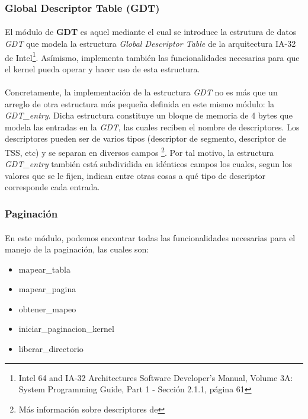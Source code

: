\documentclass[11pt, a4paper]{article}
\begin{document}
		\subsubsection{Global Descriptor Table (GDT)}
			\paragraph{}
			El módulo de \textbf{GDT} es aquel mediante el cual se introduce la estrutura de datos \textit{GDT} que modela la estructura \textit{Global Descriptor Table} de la arquitectura IA-32 de Intel\footnote{Intel 64 and IA-32 Architectures Software Developer’s Manual, Volume 3A: System Programming Guide, Part 1 - Sección 2.1.1, página 61}. Asímismo, implementa también las funcionalidades necesarias para que el kernel pueda operar y hacer uso de esta estructura.
			
			\paragraph{}
			Concretamente, la implementación de la estructura \textit{GDT} no es más que un arreglo de otra estructura más pequeña definida en este mismo módulo: la \textit{GDT\_entry}. Dicha estructura constituye un bloque de memoria de 4 bytes que modela las entradas en la \textit{GDT}, las cuales reciben el nombre de descriptores. Los descriptores pueden ser de varios tipos (descriptor de segmento, descriptor de TSS, etc) y se separan en diversos campos \footnote{Más información sobre descriptores de}. Por tal motivo, la estructura \textit{GDT\_entry} también está subdividida en idénticos campos los cuales, segun los valores que se le fijen, indican entre otras cosas a qué tipo de descriptor corresponde cada entrada.
			
			
				
		\subsubsection{Paginación}
			\paragraph{}
			En este módulo, podemos encontrar todas las funcionalidades necesarias para el manejo de la paginación, las cuales son:
			\begin{itemize}
				\item mapear\_tabla
				\item mapear\_pagina
				\item obtener\_mapeo
				\item iniciar\_paginacion\_kernel
				\item liberar\_directorio
			\end{itemize}
			
\end{document}
